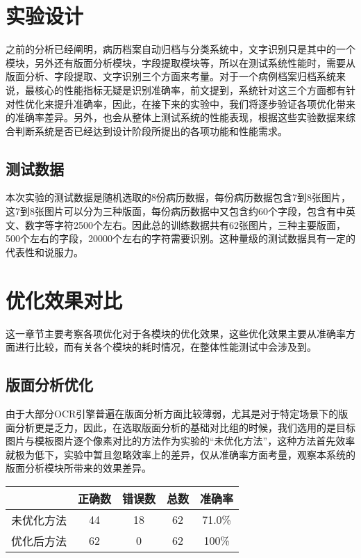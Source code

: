 \section{实验设计}
\label{sec:experiment-design}
之前的分析已经阐明，病历档案自动归档与分类系统中，文字识别只是其中的一个模块，另外还有版面分析模块，字段提取模块等，所以在测试系统性能时，需要从版面分析、字段提取、文字识别三个方面来考量。对于一个病例档案归档系统来说，最核心的性能指标无疑是识别准确率，前文提到，系统针对这三个方面都有针对性优化来提升准确率，因此，在接下来的实验中，我们将逐步验证各项优化带来的准确率差异。另外，也会从整体上测试系统的性能表现，根据这些实验数据来综合判断系统是否已经达到设计阶段所提出的各项功能和性能需求。
\subsection*{测试数据}
本次实验的测试数据是随机选取的8份病历数据，每份病历数据包含7到8张图片，这7到8张图片可以分为三种版面，每份病历数据中又包含约60个字段，包含有中英文、数字等字符2500个左右。因此总的训练数据共有62张图片，三种主要版面，500个左右的字段，20000个左右的字符需要识别。这种量级的测试数据具有一定的代表性和说服力。
\section{优化效果对比}
这一章节主要考察各项优化对于各模块的优化效果，这些优化效果主要从准确率方面进行比较，而有关各个模块的耗时情况，在整体性能测试中会涉及到。
\subsection{版面分析优化}
由于大部分OCR引擎普遍在版面分析方面比较薄弱，尤其是对于特定场景下的版面分析更是乏力，因此，在选取版面分析的基础对比组的时候，我们选用的是目标图片与模板图片逐个像素对比的方法作为实验的“未优化方法”，这种方法首先效率就极为低下，实验中暂且忽略效率上的差异，仅从准确率方面考量，观察本系统的版面分析模块所带来的效果差异。
\begin{table}[!htbp]
	\label{layout-analysis-optimization}
	\centering
	\vspace{10pt}
  \renewcommand\arraystretch{1.5}  %
	\begin{tabular}{c||c|c|c|c}
    \hline
    & 正确数 & 错误数 & 总数 & 准确率 \\
		\hline
    未优化方法 & 44 & 18 & 62 & 71.0\% \\
		\hline
    优化后方法 & 62 & 0 & 62 & 100\% \\
    \hline
	\end{tabular}
\end{table}

